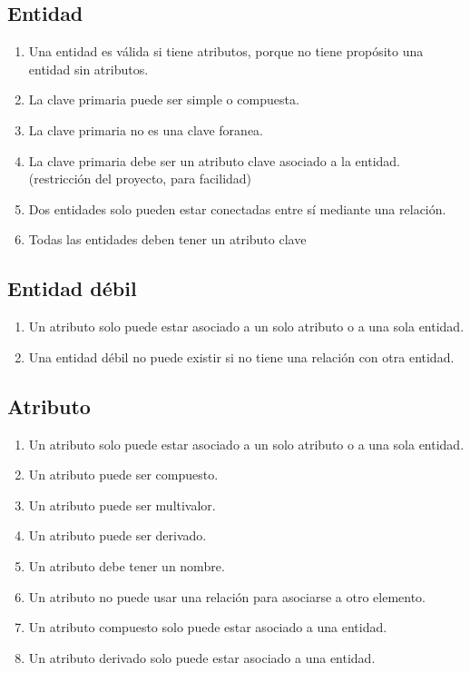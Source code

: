 \subsection{Entidad}
\begin{enumerate}
    \item Una entidad es válida si tiene atributos, porque no tiene propósito una entidad sin atributos.
    \item La clave primaria puede ser simple o compuesta.
    \item La clave primaria no es una clave foranea.
    \item La clave primaria debe ser un atributo clave asociado a la entidad. (restricción del proyecto, para facilidad)
    \item Dos entidades solo pueden estar conectadas entre sí mediante una relación.
    \item Todas las entidades deben tener un atributo clave
\end{enumerate}

\subsection{Entidad débil}
\begin{enumerate}
    \item Un atributo solo puede estar asociado a un solo atributo o a una sola entidad.
    \item Una entidad débil no puede existir si no tiene una relación con otra entidad.
\end{enumerate}

\subsection{Atributo}

\begin{enumerate}    
\item Un atributo solo puede estar asociado a un solo atributo o a una sola entidad.
\item Un atributo puede ser compuesto.
\item Un atributo puede ser multivalor.
\item Un atributo puede ser derivado.
\item Un atributo debe tener un nombre.
\item Un atributo no puede usar una relación para asociarse a otro elemento.
\item Un atributo compuesto solo puede estar asociado a una entidad.
\item Un atributo derivado solo puede estar asociado a una entidad.
\end{enumerate}

